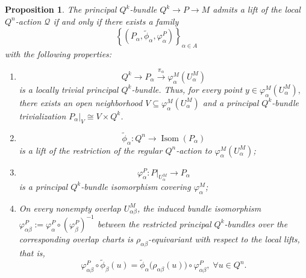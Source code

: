 \documentclass[11pt,a4paper]{article}
\numberwithin{equation}{section}
\newtheorem{prop}[definition]{Proposition}
\theoremstyle{named}
\begin{document}
\begin{prop}
\label{prop:local-lifting-chartwise}
The principal \(Q^k\)-bundle $Q^k\longrightarrow P\longrightarrow M$ admits a lift of the local \(Q^n\)-action \(\mathcal Q\) if and only if there exists a family
\[
\left\{
(P_\alpha,\widetilde\phi_\alpha,\varphi_\alpha^P)
\right\}_{\alpha\in A}
\]
with the following properties:
\begin{enumerate}
\item[(1)]
\[
Q^k\longrightarrow
P_\alpha
\overset{\pi_\alpha}{\longrightarrow}
\varphi_\alpha^M(U_\alpha^M)
\]
is a locally trivial principal \(Q^k\)-bundle. Thus, for every point \(y\in \varphi_\alpha^M(U_\alpha^M),\) there exists an open neighborhood \(V\subseteq \varphi_\alpha^M(U_\alpha^M)\) and a principal \(Q^k\)-bundle trivialization \(P_\alpha|_V\cong V\times Q^k\).

\item[(2)]
\[
\widetilde\phi_\alpha:
Q^n\longrightarrow
\operatorname{Isom}(P_\alpha)
\]
is a lift of the restriction of the regular \(Q^n\)-action to
\(\varphi_\alpha^M(U_\alpha^M)\);

\item[(3)]
\[
\varphi_\alpha^P:
P|_{U_\alpha^M}
\longrightarrow
P_\alpha
\]
is a principal \(Q^k\)-bundle isomorphism covering
\(\varphi_\alpha^M\);

\item[(4)] On every nonempty overlap \(U_{\alpha\beta}^M\), the induced bundle isomorphism \(\varphi_{\alpha\beta}^P:=\varphi_\alpha^P\circ(\varphi_\beta^P)^{-1}\) between the restricted principal \(Q^k\)-bundles over the corresponding overlap charts is \(\rho_{\alpha\beta}\)-equivariant with respect to the local lifts, that is,
\begin{equation}
\label{eq:local-lift-overlap}
\varphi_{\alpha\beta}^P\circ
\widetilde\phi_\beta(u)
=
\widetilde\phi_\alpha\bigl(\rho_{\alpha\beta}(u)\bigr)
\circ
\varphi_{\alpha\beta}^P,\;\forall u\in Q^n.
\end{equation}
\end{enumerate}
\end{prop}
\end{document}
